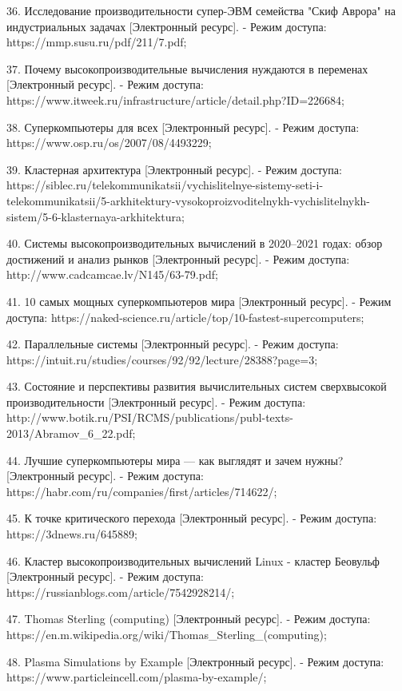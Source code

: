 \documentclass{article}
\begin{document}
36. Исследование производительности супер-ЭВМ семейства "Скиф Аврора" на индустриальных задачах [Электронный ресурс].
   - Режим доступа: https://mmp.susu.ru/pdf/211/7.pdf;

37. Почему высокопроизводительные вычисления нуждаются в переменах [Электронный ресурс].
   - Режим доступа: https://www.itweek.ru/infrastructure/article/detail.php?ID=226684;

38. Суперкомпьютеры для всех [Электронный ресурс].
   - Режим доступа: https://www.osp.ru/os/2007/08/4493229;

39. Кластерная архитектура [Электронный ресурс].
   - Режим доступа: https://siblec.ru/telekommunikatsii/vychislitelnye-sistemy-seti-i-telekommunikatsii/5-arkhitektury-vysokoproizvoditelnykh-vychislitelnykh-sistem/5-6-klasternaya-arkhitektura;

40. Системы высокопроизводительных вычислений в 2020–2021 годах: обзор достижений и анализ рынков [Электронный ресурс].
   - Режим доступа: http://www.cadcamcae.lv/N145/63-79.pdf;

41. 10 самых мощных суперкомпьютеров мира [Электронный ресурс].
   - Режим доступа: https://naked-science.ru/article/top/10-fastest-supercomputers;

42. Параллельные системы [Электронный ресурс].
   - Режим доступа: https://intuit.ru/studies/courses/92/92/lecture/28388?page=3;

43. Состояние и перспективы развития вычислительных систем сверхвысокой производительности [Электронный ресурс].
   - Режим доступа: http://www.botik.ru/PSI/RCMS/publications/publ-texts-2013/Abramov_6_22.pdf;

44. Лучшие суперкомпьютеры мира — как выглядят и зачем нужны? [Электронный ресурс].
   - Режим доступа: https://habr.com/ru/companies/first/articles/714622/;

45. К точке критического перехода [Электронный ресурс].
   - Режим доступа: https://3dnews.ru/645889;

46. Кластер высокопроизводительных вычислений Linux - кластер Беовульф [Электронный ресурс].
   - Режим доступа: https://russianblogs.com/article/7542928214/;

47. Thomas Sterling (computing) [Электронный ресурс].
   - Режим доступа: https://en.m.wikipedia.org/wiki/Thomas_Sterling_(computing);
   
48. Plasma Simulations by Example [Электронный ресурс].
   - Режим доступа: https://www.particleincell.com/plasma-by-example/;
\end{document}
